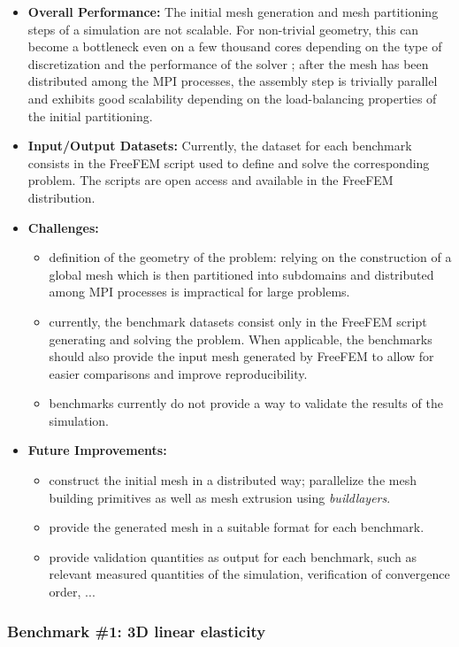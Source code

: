 \begin{itemize}
    \item \textbf{Overall Performance:} The initial mesh generation and mesh partitioning steps of a simulation are not scalable. For non-trivial geometry, this can become a bottleneck even on a few thousand cores depending on the type of discretization and the performance of the solver ; after the mesh has been distributed among the MPI processes, the assembly step is trivially parallel and exhibits good scalability depending on the load-balancing properties of the initial partitioning.
    \item \textbf{Input/Output Datasets:} Currently, the dataset for each benchmark consists in the FreeFEM script used to define and solve the corresponding problem. The scripts are open access and available in the FreeFEM distribution.
    \item \textbf{Challenges:}
        \begin{itemize}
        \item definition of the geometry of the problem: relying on the construction of a global mesh which is then partitioned into subdomains and distributed among MPI processes is impractical for large problems.
        \item currently, the benchmark datasets consist only in the FreeFEM script generating and solving the problem. When applicable, the benchmarks should also provide the input mesh generated by FreeFEM to allow for easier comparisons and improve reproducibility.
        \item benchmarks currently do not provide a way to validate the results of the simulation.
        \end{itemize}
    \item \textbf{Future Improvements:}
        \begin{itemize}
        \item construct the initial mesh in a distributed way; parallelize the mesh building primitives as well as mesh extrusion using \textit{buildlayers}.
        \item provide the generated mesh in a suitable format for each benchmark.
        \item provide validation quantities as output for each benchmark, such as relevant measured quantities of the simulation, verification of convergence order, ...
        \end{itemize}
\end{itemize}

\subsubsection{Benchmark \#1: 3D linear elasticity}

